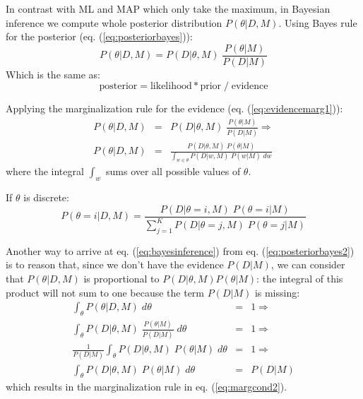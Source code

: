 In contrast with ML and MAP which only take the maximum, in Bayesian inference we compute whole posterior distribution $P(\theta|D,M)$. Using Bayes rule for the posterior (eq. (\ref{eq:posteriorbayes})):
\begin{equation}
\boxed{P(\theta|D,M) = P(D|\theta,M) \; \frac{P(\theta|M)}{P(D|M)}}
\label{eq:bayesinf}
\end{equation}
Which is the same as:
\begin{equation}
\text{posterior} = \text{likelihood} * \text{prior} \; / \; \text{evidence}
\label{eq:bayesinf0}
\end{equation}

Applying the marginalization rule for the evidence (eq. (\ref{eq:evidencemarg1})):
\begin{eqnarray}
P(\theta|D,M) & = & P(D|\theta,M) \; \frac{P(\theta|M)}{P(D|M)} \Rightarrow 
\label{eq:posteriorbayes2}
\\
P(\theta|D,M) & = & 
 \frac{P(D|\theta,M) \; P(\theta|M)}
      {\int_{w \in \theta} P(D|w,M) \; P(w|M) \; dw}
\label{eq:bayesinference}
\end{eqnarray}
where the integral $\int_w$ sums over all possible values of $\theta$.

If $\theta$ is discrete:
\begin{equation}
P(\theta=i|D,M) =
 \frac{P(D|\theta=i,M) \; P(\theta=i|M)}
      {\sum_{j=1}^K P(D|\theta=j,M) \; P(\theta=j|M)}
\label{eq:bayesinfdiscrete}
\end{equation}

Another way to arrive at eq. (\ref{eq:bayesinference}) from eq. (\ref{eq:posteriorbayes2}) is to reason that, 
since we don't have the evidence $P(D|M)$, we can consider that $P(\theta|D,M)$ is proportional to $P(D|\theta,M) P(\theta|M)$: the integral of this product will not sum to one because the term $P(D|M)$ is missing:
%
\begin{eqnarray}
\int_{\theta} P(\theta|D,M) \; d \theta & = & 1 \Rightarrow \\
\int_{\theta} P(D|\theta,M) \; \frac{P(\theta|M)}{P(D|M)} \; d \theta 
   & = & 1 \Rightarrow \\
\frac{1}{P(D|M)} \int_{\theta} P(D|\theta,M) \; P(\theta|M) \; d \theta 
   & = & 1 \Rightarrow \\
\int_{\theta} P(D|\theta,M) \; P(\theta | M) \; d \theta & = & P(D|M)
\label{eq:margDM}
\end{eqnarray}
which results in the marginalization rule in eq. (\ref{eq:margcond2}).

